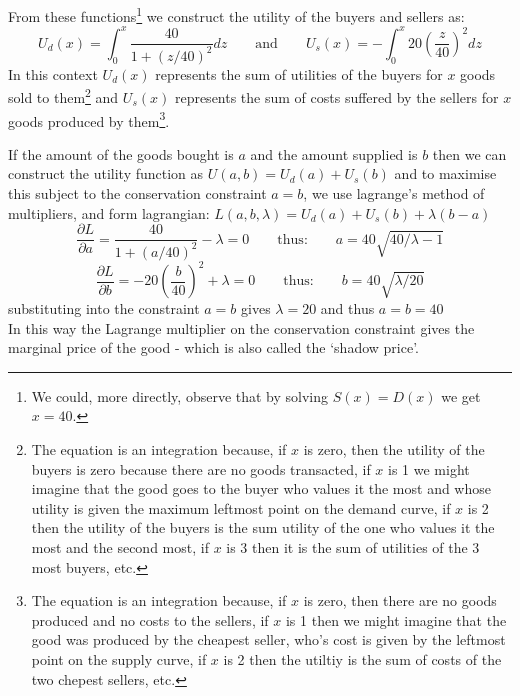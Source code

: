From these functions\footnote{We could, more directly, observe that by solving $S(x)=D(x)$ we get $x=40$.} we construct the utility of the buyers and sellers as:
$$U_d(x) = \int_0^x\frac{40}{1+(z/40)^2}dz \quad\quad\text{and}\quad\quad U_s(x) = -\int_0^x20\left(\frac{z}{40}\right)^2dz$$
In this context $U_d(x)$ represents the sum of utilities of the buyers for $x$ goods sold to them\footnote{The equation is an integration because, if $x$ is zero, then the utility of the buyers is zero because there are no goods transacted, if $x$ is 1 we might imagine that the good goes to the buyer who values it the most and whose utility is given the maximum leftmost point on the demand curve, if $x$ is 2 then the utility of the buyers is the sum utility of the one who values it the most and the second most, if $x$ is 3 then it is the sum of utilities of the 3 most buyers, etc.} and $U_s(x)$ represents the sum of costs suffered by the sellers for $x$ goods produced by them\footnote{The equation is an integration because, if $x$ is zero, then there are no goods produced and no costs to the sellers, if $x$ is 1 then we might imagine that the good was produced by the cheapest seller, who's cost is given by the leftmost point on the supply curve, if $x$ is 2 then the utiltiy is the sum of costs of the two chepest sellers, etc.}.

If the amount of the goods bought is $a$ and the amount supplied is $b$ then we can construct the utility function as $U(a,b) = U_d(a) + U_s(b)$
and to maximise this subject to the conservation constraint $a=b$, we use lagrange's method of multipliers, and form lagrangian:
$L(a,b,\lambda) = U_d(a) + U_s(b) + \lambda(b-a)$
$$\frac{\partial L}{\partial a} = \frac{40}{1+(a/40)^2} - \lambda = 0 \quad\quad\text{thus:}\quad\quad a = 40\sqrt{40/\lambda - 1}$$
$$\frac{\partial L}{\partial b} = -20\left(\frac{b}{40}\right)^2 + \lambda = 0 \quad\quad\text{thus:}\quad\quad b = 40\sqrt{\lambda/20}$$
substituting into the constraint $a=b$ gives $\lambda=20$ and thus $a=b=40$\\
In this way the Lagrange multiplier on the conservation constraint gives the marginal price of the good - which is also called the `shadow price'.

